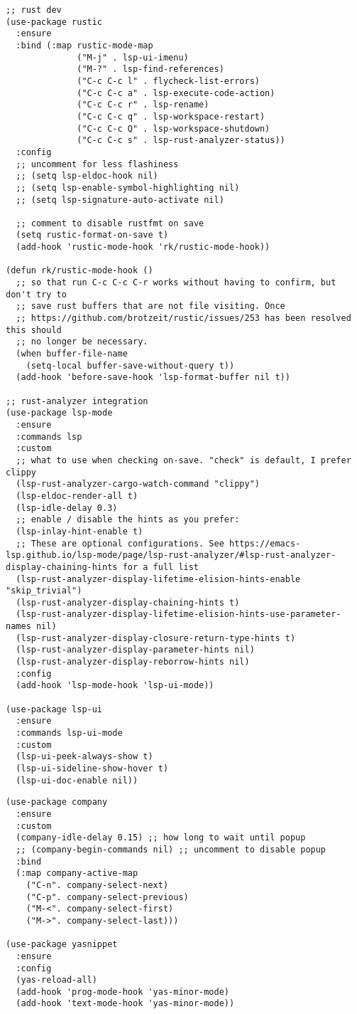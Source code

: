 \documentclass[11pt]{article}
\begin{document}
\begin{verbatim}
;; rust dev
(use-package rustic
  :ensure
  :bind (:map rustic-mode-map
              ("M-j" . lsp-ui-imenu)
              ("M-?" . lsp-find-references)
              ("C-c C-c l" . flycheck-list-errors)
              ("C-c C-c a" . lsp-execute-code-action)
              ("C-c C-c r" . lsp-rename)
              ("C-c C-c q" . lsp-workspace-restart)
              ("C-c C-c Q" . lsp-workspace-shutdown)
              ("C-c C-c s" . lsp-rust-analyzer-status))
  :config
  ;; uncomment for less flashiness
  ;; (setq lsp-eldoc-hook nil)
  ;; (setq lsp-enable-symbol-highlighting nil)
  ;; (setq lsp-signature-auto-activate nil)

  ;; comment to disable rustfmt on save
  (setq rustic-format-on-save t)
  (add-hook 'rustic-mode-hook 'rk/rustic-mode-hook))

(defun rk/rustic-mode-hook ()
  ;; so that run C-c C-c C-r works without having to confirm, but don't try to
  ;; save rust buffers that are not file visiting. Once
  ;; https://github.com/brotzeit/rustic/issues/253 has been resolved this should
  ;; no longer be necessary.
  (when buffer-file-name
    (setq-local buffer-save-without-query t))
  (add-hook 'before-save-hook 'lsp-format-buffer nil t))

;; rust-analyzer integration
(use-package lsp-mode
  :ensure
  :commands lsp
  :custom
  ;; what to use when checking on-save. "check" is default, I prefer clippy
  (lsp-rust-analyzer-cargo-watch-command "clippy")
  (lsp-eldoc-render-all t)
  (lsp-idle-delay 0.3)
  ;; enable / disable the hints as you prefer:
  (lsp-inlay-hint-enable t)
  ;; These are optional configurations. See https://emacs-lsp.github.io/lsp-mode/page/lsp-rust-analyzer/#lsp-rust-analyzer-display-chaining-hints for a full list
  (lsp-rust-analyzer-display-lifetime-elision-hints-enable "skip_trivial")
  (lsp-rust-analyzer-display-chaining-hints t)
  (lsp-rust-analyzer-display-lifetime-elision-hints-use-parameter-names nil)
  (lsp-rust-analyzer-display-closure-return-type-hints t)
  (lsp-rust-analyzer-display-parameter-hints nil)
  (lsp-rust-analyzer-display-reborrow-hints nil)
  :config
  (add-hook 'lsp-mode-hook 'lsp-ui-mode))

(use-package lsp-ui
  :ensure
  :commands lsp-ui-mode
  :custom
  (lsp-ui-peek-always-show t)
  (lsp-ui-sideline-show-hover t)
  (lsp-ui-doc-enable nil))
\end{verbatim}

\begin{verbatim}
(use-package company
  :ensure
  :custom
  (company-idle-delay 0.15) ;; how long to wait until popup
  ;; (company-begin-commands nil) ;; uncomment to disable popup
  :bind
  (:map company-active-map
	("C-n". company-select-next)
	("C-p". company-select-previous)
	("M-<". company-select-first)
	("M->". company-select-last)))

(use-package yasnippet
  :ensure
  :config
  (yas-reload-all)
  (add-hook 'prog-mode-hook 'yas-minor-mode)
  (add-hook 'text-mode-hook 'yas-minor-mode))
\end{verbatim}
\end{document}
